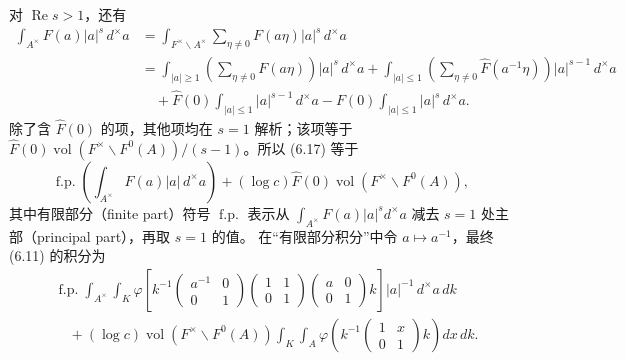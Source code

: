 对 $\operatorname{Re}s>1$，还有
\[
\begin{aligned}
 \int_{A^\times}F(a)|a|^s\,d^\times a
 &=\int_{F^\times\backslash A^\times}\sum_{\eta\ne0}F(a\eta)|a|^s\,d^\times a\\
 &=\int_{|a|\ge1}\left(\sum_{\eta\ne0}F(a\eta)\right)|a|^s\,d^\times a
 +\int_{|a|\le1}\left(\sum_{\eta\ne0}\widehat F(a^{-1}\eta)\right)|a|^{s-1}\,d^\times a\\
 &\quad+\widehat F(0)\int_{|a|\le1}|a|^{s-1}\,d^\times a
 -F(0)\int_{|a|\le1}|a|^s\,d^\times a.
\end{aligned}
\]
除了含 $\widehat F(0)$ 的项，其他项均在 $s=1$ 解析；该项等于
$\widehat F(0)\operatorname{vol}(F^\times\backslash F^0(A))/(s-1)$。所以 (6.17) 等于
\[
 \operatorname{f.p.}\left(\int_{A^\times}F(a)|a|\,d^\times a\right)
 +(\log c)\widehat F(0)\operatorname{vol}(F^\times\backslash F^0(A)),
\]
其中有限部分（finite part）符号 $\operatorname{f.p.}$ 表示从
$\int_{A^\times}F(a)|a|^s d^\times a$ 减去 $s=1$ 处主部（principal part），再取 $s=1$ 的值。
在“有限部分积分”中令 $a\mapsto a^{-1}$，最终 (6.11) 的积分为
\begin{equation}
\begin{split}
 &\operatorname{f.p.}\int_{A^\times}\int_K
 \varphi\!\left[k^{-1}\begin{pmatrix}a^{-1}&0\\0&1\end{pmatrix}
 \begin{pmatrix}1&1\\0&1\end{pmatrix}\begin{pmatrix}a&0\\0&1\end{pmatrix}k\right]
 |a|^{-1}\,d^\times a\,dk\\
 &\quad+(\log c)\operatorname{vol}(F^\times\backslash F^0(A))
 \int_K\int_A\varphi\!\left(k^{-1}\begin{pmatrix}1&x\\0&1\end{pmatrix}k\right)dx\,dk.
\end{split}\tag{6.18}
\end{equation}

